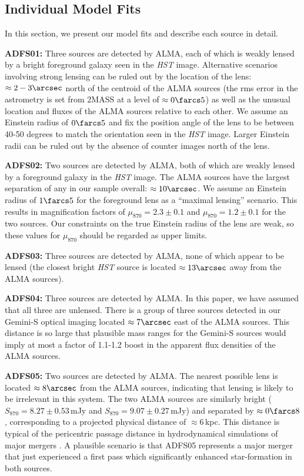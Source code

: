 \documentclass[iop]{emulateapj}
\begin{document}
\subsection{Individual Model Fits}\label{objectbyobject}

In this section, we present our model fits and describe each source in detail.

{\bf ADFS01:} Three sources are detected by ALMA, each of which is weakly
lensed by a bright foreground galaxy seen in the {\it HST} image.  Alternative
scenarios involving strong lensing can be ruled out by the location of the
lens: $\approx 2-3\arcsec$ north of the centroid of the ALMA sources (the rms
error in the astrometry is set from 2MASS at a level of $\approx 0\farcs5$) as
well as the unusual location and fluxes of the ALMA sources relative to each
other.  We assume an Einstein radius of $0\farcs5$ and fix the position angle
of the lens to be between 40-50 degrees to match the orientation seen in the
{\it HST} image.  Larger Einstein radii can be ruled out by the absence of
counter images north of the lens.

{\bf ADFS02:} Two sources are detected by ALMA, both of which are weakly lensed
by a foreground galaxy in the {\it HST} image.  The ALMA sources have the
largest separation of any in our sample overall: $\approx 10\arcsec$.  We
assume an Einstein radius of $1\farcs5$ for the foreground lens as a ``maximal
lensing'' scenario.  This results in magnification factors of $\mu_{870} = 2.3
\pm 0.1$ and $\mu_{870} = 1.2 \pm 0.1$ for the two sources.  Our constraints on
the true Einstein radius of the lens are weak, so these values for $\mu_{870}$
should be regarded as upper limits.

{\bf ADFS03:} Three sources are detected by ALMA, none of which appear to be
lensed (the closest bright {\it HST} source is located $\approx 13\arcsec$ away
from the ALMA sources).

{\bf ADFS04:} Three sources are detected by ALMA.  In this paper, we have
assumed that all three are unlensed.  There is a group of three sources
detected in our Gemini-S optical imaging located $\approx 7\arcsec$ east of the
ALMA sources.  This distance is so large that plausible mass ranges for the
Gemini-S sources would imply at most a factor of 1.1-1.2 boost in the apparent
flux densities of the ALMA sources.

{\bf ADFS05:} Two sources are detected by ALMA.  The nearest possible lens is
located $\approx 8\arcsec$ from the ALMA sources, indicating that lensing is
likely to be irrelevant in this system.  The two ALMA sources are similarly
bright ($S_{870} = 8.27 \pm 0.53\,$mJy and $S_{870} = 9.07 \pm 0.27\,$mJy) and
separated by $\approx 0\farcs8$, corresponding to a projected physical distance
of $\approx 6\,$kpc. This distance is typical of the pericentric passage
distance in hydrodynamical simulations of major mergers
\citep[e.g.,][]{Hayward:2012lr}.  A plausible scenario is that ADFS05
represents a major merger that just experienced a first pass which
significantly enhanced star-formation in both sources.
\end{document}
